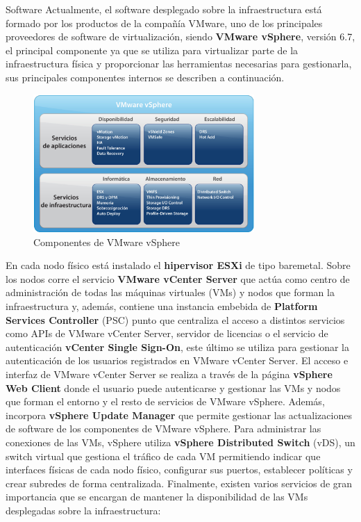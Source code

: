 \begin{section}{Software}
    \label{subsec:softwareinstalado}
    Actualmente, el software desplegado sobre la infraestructura está formado por los productos de la compañía VMware, uno de los principales proveedores de software de virtualización, siendo \textbf{VMware vSphere}, versión 6.7, el principal componente ya que se utiliza para virtualizar parte de la infraestructura física y proporcionar las herramientas necesarias para gestionarla, sus principales componentes internos se describen a continuación.
    \begin{figure}[h]
        \centering
        \includegraphics[width=0.75\textwidth]{imaxes/cap2recursos/contentVSphere}
        \caption{Componentes de VMware vSphere\cite{fotovSphere}}
        \label{fig:vSphere-components}
      \end{figure}
    En cada nodo físico está instalado el \textbf{hipervisor ESXi} de tipo baremetal. Sobre los nodos corre el servicio \textbf{VMware vCenter Server} que actúa como centro de administración de todas las máquinas virtuales (VMs) y nodos que forman la infraestructura y, además, contiene una instancia embebida de \textbf{Platform Services Controller} (PSC) punto que centraliza el acceso a distintos servicios como APIs de VMware vCenter Server, servidor de licencias o el servicio de autenticación \textbf{vCenter Single Sign-On}, este último se utiliza para gestionar la autenticación de los usuarios registrados en VMware vCenter Server. El acceso e interfaz de VMware vCenter Server se realiza a través de la página \textbf{vSphere Web Client} donde el usuario puede autenticarse y gestionar las VMs y nodos que forman el entorno y el resto de servicios de VMware vSphere. Además, incorpora \textbf{vSphere Update Manager} que permite gestionar las actualizaciones de software de los componentes de VMware vSphere. Para administrar las conexiones de las VMs, vSphere utiliza \textbf{vSphere Distributed Switch} (vDS), un switch virtual que gestiona el tráfico de cada VM permitiendo indicar que interfaces físicas de cada nodo físico, configurar sus puertos, establecer políticas y crear subredes de forma centralizada. Finalmente, existen varios servicios de gran importancia que se encargan de mantener la disponibilidad de las VMs desplegadas sobre la infraestructura:
    

\end{section}
